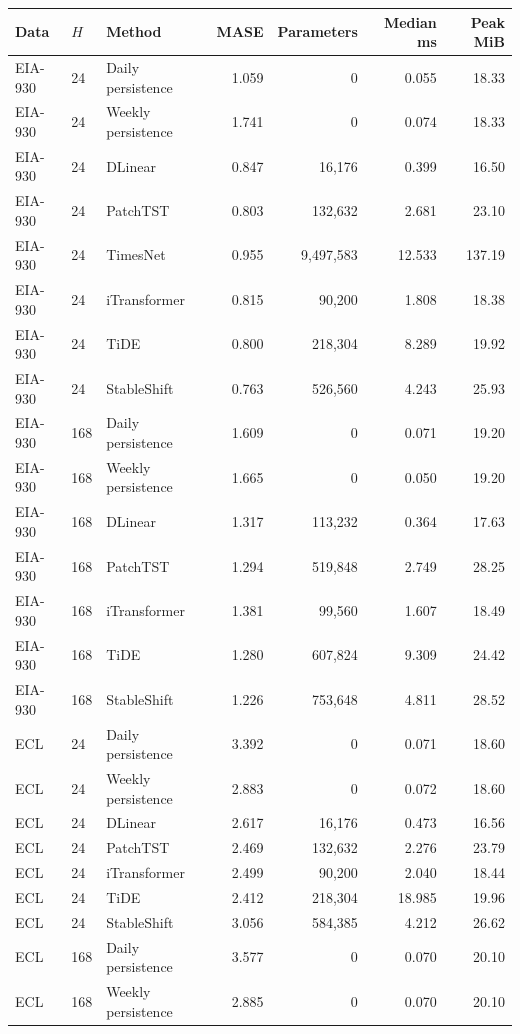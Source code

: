 {
\footnotesize
\begin{longtable}{llp{3.4cm}rrrr}
\toprule
Data & $H$ & Method & MASE & Parameters & Median ms & Peak MiB \\
\midrule
\endhead
EIA-930 & 24 & Daily persistence & 1.059 & 0 & 0.055 & 18.33 \\
EIA-930 & 24 & Weekly persistence & 1.741 & 0 & 0.074 & 18.33 \\
EIA-930 & 24 & DLinear & 0.847 & 16,176 & 0.399 & 16.50 \\
EIA-930 & 24 & PatchTST & 0.803 & 132,632 & 2.681 & 23.10 \\
EIA-930 & 24 & TimesNet & 0.955 & 9,497,583 & 12.533 & 137.19 \\
EIA-930 & 24 & iTransformer & 0.815 & 90,200 & 1.808 & 18.38 \\
EIA-930 & 24 & TiDE & 0.800 & 218,304 & 8.289 & 19.92 \\
EIA-930 & 24 & StableShift & 0.763 & 526,560 & 4.243 & 25.93 \\
EIA-930 & 168 & Daily persistence & 1.609 & 0 & 0.071 & 19.20 \\
EIA-930 & 168 & Weekly persistence & 1.665 & 0 & 0.050 & 19.20 \\
EIA-930 & 168 & DLinear & 1.317 & 113,232 & 0.364 & 17.63 \\
EIA-930 & 168 & PatchTST & 1.294 & 519,848 & 2.749 & 28.25 \\
EIA-930 & 168 & iTransformer & 1.381 & 99,560 & 1.607 & 18.49 \\
EIA-930 & 168 & TiDE & 1.280 & 607,824 & 9.309 & 24.42 \\
EIA-930 & 168 & StableShift & 1.226 & 753,648 & 4.811 & 28.52 \\
ECL & 24 & Daily persistence & 3.392 & 0 & 0.071 & 18.60 \\
ECL & 24 & Weekly persistence & 2.883 & 0 & 0.072 & 18.60 \\
ECL & 24 & DLinear & 2.617 & 16,176 & 0.473 & 16.56 \\
ECL & 24 & PatchTST & 2.469 & 132,632 & 2.276 & 23.79 \\
ECL & 24 & iTransformer & 2.499 & 90,200 & 2.040 & 18.44 \\
ECL & 24 & TiDE & 2.412 & 218,304 & 18.985 & 19.96 \\
ECL & 24 & StableShift & 3.056 & 584,385 & 4.212 & 26.62 \\
ECL & 168 & Daily persistence & 3.577 & 0 & 0.070 & 20.10 \\
ECL & 168 & Weekly persistence & 2.885 & 0 & 0.070 & 20.10 \\

\end{longtable}}
